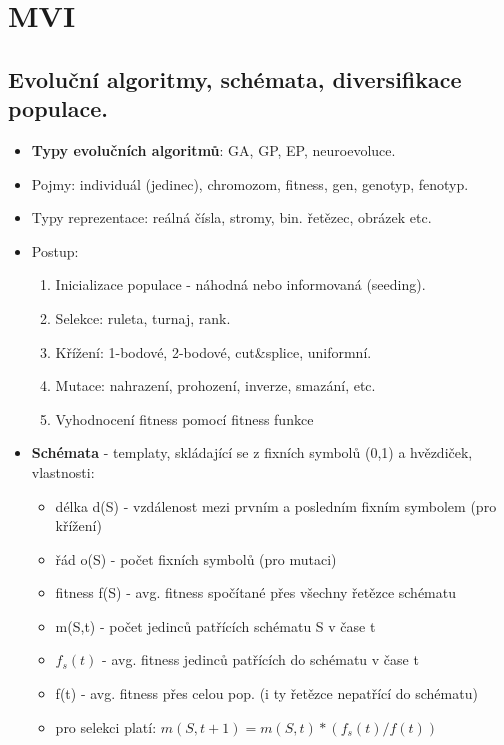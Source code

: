 \documentclass[a4paper,hidelinks]{article}
\begin{document}
\section{MVI}

\subsection{Evoluční algoritmy, schémata, diversifikace populace.}

\begin{itemize}
    \item \textbf{Typy evolučních algoritmů}: GA, GP, EP, neuroevoluce.
    \item Pojmy: individuál (jedinec), chromozom, fitness, gen, genotyp, fenotyp.
    \item Typy reprezentace: reálná čísla, stromy, bin. řetězec, obrázek etc.
    \item Postup:
        \begin{enumerate}
            \item Inicializace populace - náhodná nebo informovaná (seeding).
            \item Selekce: ruleta, turnaj, rank.
            \item Křížení: 1-bodové, 2-bodové, cut\&splice, uniformní.
            \item Mutace: nahrazení, prohození, inverze, smazání, etc.
            \item Vyhodnocení fitness pomocí fitness funkce
        \end{enumerate}
    \item \textbf{Schémata} - templaty, skládající se z fixních symbolů (0,1) a hvězdiček, vlastnosti:
        \begin{itemize}
            \item délka d(S) - vzdálenost mezi prvním a posledním fixním symbolem (pro křížení)
            \item řád o(S) - počet fixních symbolů (pro mutaci)
            \item fitness f(S) - avg. fitness spočítané přes všechny řetězce schématu
            \item m(S,t) - počet jedinců patřících schématu S v čase t
            \item $f_s(t)$ - avg. fitness jedinců patřících do schématu v čase t
            \item f(t) - avg. fitness přes celou pop. (i ty řetězce nepatřící do schématu)
            \item pro selekci platí: $m(S,t+1)=m(S,t)*(f_s(t)/f(t))$

\end{itemize}
\end{itemize}
\end{document}
